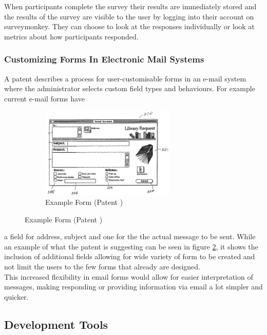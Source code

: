 \documentclass[12pt]{article}  %
\begin{document}
When participants complete the survey their results are immediately stored and the results of the survey are visible to the user by logging into their account on surveymonkey. They can choose to look at the responses individually or look at metrics about how participants responded.


\subsubsection{Customizing Forms In Electronic Mail Systems}
\noindent
A patent \cite{noauthor_customizing_2006} describes a process for user-customisable forms in an e-mail system where the administrator selects custom field types and behaviours.  For example current e-mail forms have

\begin{figure}
\vspace*{-\baselineskip}
\begin{figure}[H]
\includegraphics[width=0.7\textwidth]{images/emailform.png}
	\caption{Example Form (Patent \cite{noauthor_customizing_2006})}
	\label{fig:emailform}
\end{figure}
\end{figure}

\noindent
a field for address, subject and one for the the actual message to be sent. While an example of what the patent is suggesting can be seen in figure \ref{fig:emailform}, it shows the inclusion of additional fields allowing for wide variety of form to be created and not limit the users to  the few forms that already are designed.\\
This increased flexibility in email forms would allow for easier  interpretation of messages, making responding or providing information via email a lot simpler and quicker.


\subsection{Development Tools}
\end{document}
